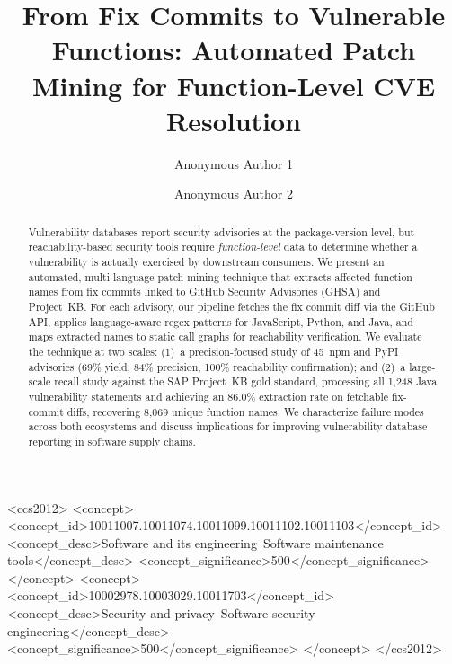 \documentclass[sigconf,nonacm]{acmart}
\begin{document}
\title{From Fix Commits to Vulnerable Functions: Automated Patch Mining for Function-Level CVE Resolution}

\author{Anonymous Author 1}

\author{Anonymous Author 2}

\begin{abstract}
Vulnerability databases report security advisories at the package-version
level, but reachability-based security tools require \emph{function-level}
data to determine whether a vulnerability is actually exercised by downstream
consumers.
We present an automated, multi-language patch mining technique that extracts
affected function names from fix commits linked to GitHub Security Advisories
(GHSA) and Project~KB.
For each advisory, our pipeline fetches the fix commit diff via the GitHub
API, applies language-aware regex patterns for JavaScript, Python, and Java,
and maps extracted names to static call graphs for reachability verification.
We evaluate the technique at two scales: (1)~a precision-focused study of
45~npm and PyPI advisories (69\% yield, 84\% precision, 100\% reachability
confirmation); and (2)~a large-scale recall study against the SAP Project~KB
gold standard, processing all 1{,}248 Java vulnerability statements and
achieving an 86.0\% extraction rate on fetchable fix-commit diffs, recovering
8{,}069 unique function names.
We characterize failure modes across both ecosystems and discuss implications
for improving vulnerability database reporting in software supply chains.
\end{abstract}

\begin{CCSXML}
<ccs2012>
<concept>
<concept_id>10011007.10011074.10011099.10011102.10011103</concept_id>
<concept_desc>Software and its engineering~Software maintenance tools</concept_desc>
<concept_significance>500</concept_significance>
</concept>
<concept>
<concept_id>10002978.10003029.10011703</concept_id>
<concept_desc>Security and privacy~Software security engineering</concept_desc>
<concept_significance>500</concept_significance>
</concept>
</ccs2012>
\end{CCSXML}

\end{document}
